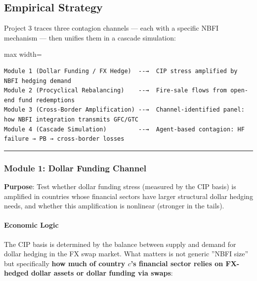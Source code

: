 \documentclass[11pt,a4paper]{article}
\begin{document}
\subsection{Empirical Strategy}

Project 3 traces three contagion channels --- each with a specific NBFI mechanism --- then unifies them in a cascade simulation:


\begin{adjustbox}{max width=\textwidth}
\begin{minipage}{1.5\textwidth}
\begin{verbatim}
Module 1 (Dollar Funding / FX Hedge)  --→  CIP stress amplified by NBFI hedging demand
Module 2 (Procyclical Rebalancing)    --→  Fire-sale flows from open-end fund redemptions
Module 3 (Cross-Border Amplification) --→  Channel-identified panel: how NBFI integration transmits GFC/GTC
Module 4 (Cascade Simulation)         --→  Agent-based contagion: HF failure → PB → cross-border losses
\end{verbatim}
\end{minipage}
\end{adjustbox}


\bigskip\noindent\rule{\textwidth}{0.4pt}\bigskip


\subsubsection{Module 1: Dollar Funding Channel}

\textbf{Purpose}: Test whether dollar funding stress (measured by the CIP basis) is amplified in countries whose financial sectors have larger structural dollar hedging needs, and whether this amplification is nonlinear (stronger in the tails).


\paragraph{Economic Logic}

The CIP basis is determined by the balance between supply and demand for dollar hedging in the FX swap market. What matters is not generic ''NBFI size'' but specifically \textbf{how much of country $c$'s financial sector relies on FX-hedged dollar assets or dollar funding via swaps}:
\end{document}
